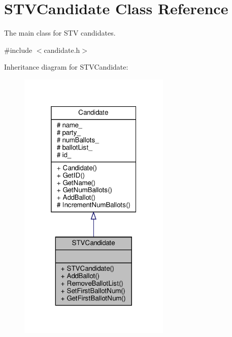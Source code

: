 \hypertarget{classSTVCandidate}{}\section{S\+T\+V\+Candidate Class Reference}
\label{classSTVCandidate}


The main class for S\+TV candidates.  




{\ttfamily \#include $<$candidate.\+h$>$}



Inheritance diagram for S\+T\+V\+Candidate\+:\nopagebreak
\begin{figure}[H]
\begin{center}
\leavevmode
\includegraphics[width=205pt]{classSTVCandidate__inherit__graph}
\end{center}
\end{figure}


